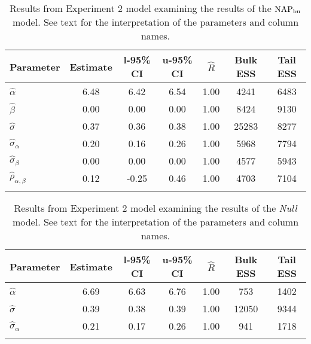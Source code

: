\begin{table}

\caption{Results from Experiment 2 model examining the results of the $\operatorname{NAP}_{\text{bu}}$ model. \label{tab:Experiment 2-NAPbu}See text for the interpretation of the parameters and column names.}

\begin{tabular}{l *3{S[table-format=-1.2]} S[table-format=1.2] *2{S[table-format=5.0]}}
\lsptoprule
Parameter & {Estimate} & {l-95\% CI} & {u-95\% CI} & {$\hat{R}$} & {Bulk ESS} & {Tail ESS}\\
\midrule
$\hat\alpha$ & 6.48 & 6.42 & 6.54 & 1.00 & 4241 & 6483\\
$\hat\beta$ & 0.00 & 0.00 & 0.00 & 1.00 & 8424 & 9130\\
$\hat\sigma$ & 0.37 & 0.36 & 0.38 & 1.00 & 25283 & 8277\\
$\hat\sigma_{\alpha}$ & 0.20 & 0.16 & 0.26 & 1.00 & 5968 & 7794\\
$\hat\sigma_{\beta}$ & 0.00 & 0.00 & 0.00 & 1.00 & 4577 & 5943\\
$\hat\rho_{\alpha,\beta}$ & 0.12 & -0.25 & 0.46 & 1.00 & 4703 & 7104\\
\lspbottomrule
\end{tabular}

\end{table}






\begin{table}

\caption{Results from Experiment 2 model examining the results of the \textit{Null} model. \label{tab:Experiment 2-null}See text for the interpretation of the parameters and column names.}

\begin{tabular}{l *3{S[table-format=-1.2]} S[table-format=1.2] *2{S[table-format=5.0]}}
\lsptoprule
Parameter & {Estimate} & {l-95\% CI} & {u-95\% CI} & {$\hat{R}$} & {Bulk ESS} & {Tail ESS}\\
\midrule
$\hat\alpha$ & 6.69 & 6.63 & 6.76 & 1.00 & 753 & 1402\\
$\hat\sigma$ & 0.39 & 0.38 & 0.39 & 1.00 & 12050 & 9344\\
$\hat\sigma_{\alpha}$ & 0.21 & 0.17 & 0.26 & 1.00 & 941 & 1718\\
\lspbottomrule
\end{tabular}

\end{table}






